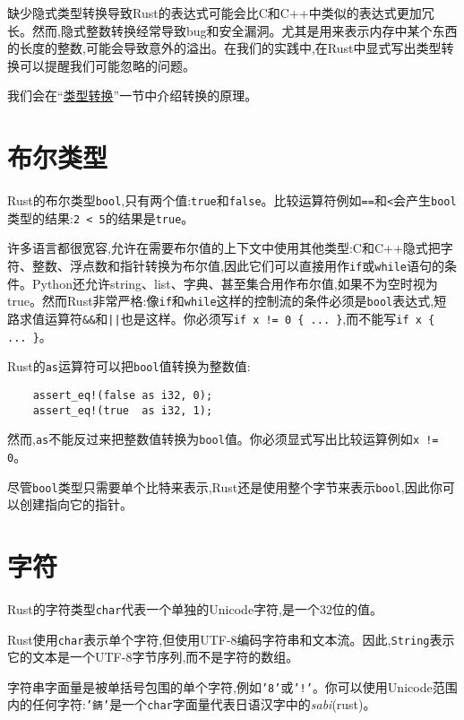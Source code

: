 缺少隐式类型转换导致Rust的表达式可能会比C和C++中类似的表达式更加冗长。然而,隐式整数转换经常导致bug和安全漏洞。尤其是用来表示内存中某个东西的长度的整数,可能会导致意外的溢出。在我们的实践中,在Rust中显式写出类型转换可以提醒我们可能忽略的问题。

我们会在“\hyperref[cast]{类型转换}”一节中介绍转换的原理。

\section{布尔类型}

Rust的布尔类型\texttt{bool},只有两个值:\texttt{true}和\texttt{false}。比较运算符例如\texttt{==}和\texttt{<}会产生\texttt{bool}类型的结果:\texttt{2 < 5}的结果是\texttt{true}。

许多语言都很宽容,允许在需要布尔值的上下文中使用其他类型:C和C++隐式把字符、整数、浮点数和指针转换为布尔值,因此它们可以直接用作\texttt{if}或\texttt{while}语句的条件。Python还允许string、list、字典、甚至集合用作布尔值,如果不为空时视为true。然而Rust非常严格:像\texttt{if}和\texttt{while}这样的控制流的条件必须是\texttt{bool}表达式,短路求值运算符\texttt{\&\&}和\texttt{||}也是这样。你必须写\texttt{if x != 0 \{ ... \}},而不能写\texttt{if x \{ ... \}}。

Rust的\texttt{as}运算符可以把\texttt{bool}值转换为整数值:
\begin{verbatim}
    assert_eq!(false as i32, 0);
    assert_eq!(true  as i32, 1);
\end{verbatim}

然而,\texttt{as}不能反过来把整数值转换为\texttt{bool}值。你必须显式写出比较运算例如\texttt{x != 0}。

尽管\texttt{bool}类型只需要单个比特来表示,Rust还是使用整个字节来表示\texttt{bool},因此你可以创建指向它的指针。

\section{字符}\label{char}
Rust的字符类型\texttt{char}代表一个单独的Unicode字符,是一个32位的值。

Rust使用\texttt{char}表示单个字符,但使用UTF-8编码字符串和文本流。因此,\texttt{String}表示它的文本是一个UTF-8字节序列,而不是字符的数组。

字符串字面量是被单括号包围的单个字符,例如\texttt{'8'}或\texttt{'!'}。你可以使用Unicode范围内的任何字符:\texttt{'錆'}是一个\texttt{char}字面量代表日语汉字中的\emph{sabi}(rust)。

